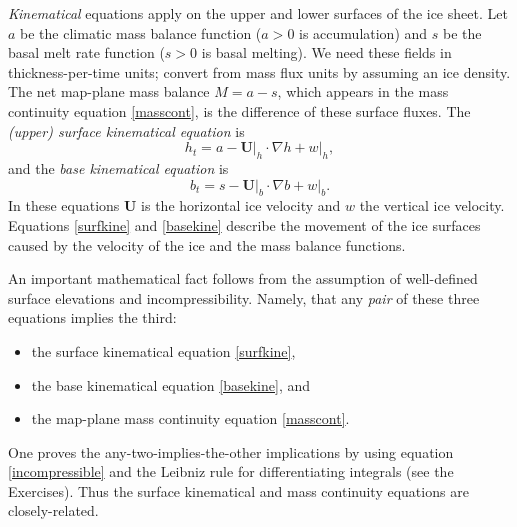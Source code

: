 \documentclass[letterpaper,final,12pt,reqno]{amsart}
\newcommand{\grad}{\nabla}
\begin{document}
\emph{Kinematical} equations apply on the upper and lower surfaces of the ice sheet.  Let $a$ be the climatic mass balance function ($a>0$ is accumulation) and $s$ be the basal melt rate function ($s>0$ is basal melting).  We need these fields in thickness-per-time units; convert from mass flux units by assuming an ice density.  The net map-plane mass balance $M=a-s$, which appears in the mass continuity equation \eqref{masscont}, is the difference of these surface fluxes.  The \emph{(upper) surface kinematical equation} is
\begin{equation}
h_t = a - \mathbf{U}\big|_h \cdot \grad h + w\big|_h,  \label{surfkine}
\end{equation}
and the \emph{base kinematical equation} is
\begin{equation}
b_t = s - \mathbf{U}\big|_b \cdot \grad b + w\big|_b.  \label{basekine}
\end{equation}
In these equations $\mathbf{U}$ is the horizontal ice velocity and $w$ the vertical ice velocity.  Equations \eqref{surfkine} and \eqref{basekine} describe the movement of the ice surfaces caused by the velocity of the ice and the mass balance functions.

An important mathematical fact follows from the assumption of well-defined surface elevations and incompressibility.  Namely, that any \emph{pair} of these three equations implies the third:
  \begin{itemize}
  \item the surface kinematical equation \eqref{surfkine},
  \item the base kinematical equation \eqref{basekine}, and
  \item the map-plane mass continuity equation \eqref{masscont}.
  \end{itemize}
One proves the any-two-implies-the-other implications by using equation \eqref{incompressible} and the Leibniz rule for differentiating integrals (see the Exercises).  Thus the surface kinematical and mass continuity equations are closely-related.
\end{document}
